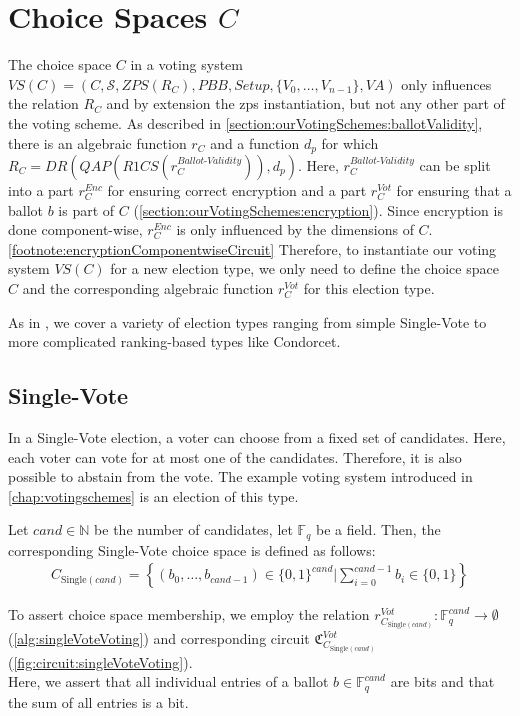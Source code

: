 \section{Choice Spaces $C$}
\label{section:ourVotingSchemes:choiceSpaces}
The choice space $C$ in a voting system $VS(C)=(C, \mathcal{S}, ZPS(R_C), PBB, Setup, \{V_0, \dots, V_{n-1}\}, VA)$ only influences the relation $R_C$ and by extension the \gls{zps} instantiation, but not any other part of the voting scheme.
As described in \cref{section:ourVotingSchemes:ballotValidity}, there is an algebraic function $r_C$ and a function $d_p$ for which $R_C=DR(QAP(R1CS(r_C^{Ballot\text{-}Validity})), d_p)$.
Here, $r_C^{Ballot\text{-}Validity}$ can be split into a part $r_C^{Enc}$ for ensuring correct encryption and a part $r_C^{Vot}$ for ensuring that a ballot $b$ is part of $C$ (\cref{section:ourVotingSchemes:encryption}).
Since encryption is done component-wise, $r_C^{Enc}$ is only influenced by the dimensions of $C$.\cref{footnote:encryptionComponentwiseCircuit}
Therefore, to instantiate our voting system $VS(C)$ for a new election type, we only need to define the choice space $C$ and the corresponding algebraic function $r_C^{Vot}$ for this election type.

As in \cite{huber_zk-snarks_2025}, we cover a variety of election types ranging from simple Single-Vote to more complicated ranking-based types like Condorcet.

\subsection{Single-Vote}
In a Single-Vote election, a voter can choose from a fixed set of candidates. 
Here, each voter can vote for at most one of the candidates.
Therefore, it is also possible to abstain from the vote.
The example voting system introduced in \cref{chap:votingschemes} is an election of this type.

\begin{definition}
    Let $cand\in\mathbb{N}$ be the number of candidates, let $\mathbb{F}_q$ be a field.
    Then, the corresponding Single-Vote choice space is defined as follows:
    {\setlength{\mathindent}{2pt}
    \begin{align*}
        C_{\text{Single}(cand)}= \left\{(b_0,\dots, b_{cand-1})\in \{0,1\}^{cand}\Bigg| \sum_{i=0}^{cand-1}b_i\in\{0,1\}\right\}
    \end{align*}
    }
    
    To assert choice space membership, we employ the relation $r_{C_{\text{Single}(cand)}}^{Vot}:\mathbb{F}_q^{cand}\to\emptyset$ (\cref{alg:singleVoteVoting}) and corresponding circuit $\mathfrak{C}_{C_{\text{Single}(cand)}}^{Vot}$ (\cref{fig:circuit:singleVoteVoting}).\\
    Here, we assert that all individual entries of a ballot $b\in\mathbb{F}_q^{cand}$ are bits and that the sum of all entries is a bit. 
\end{definition}

